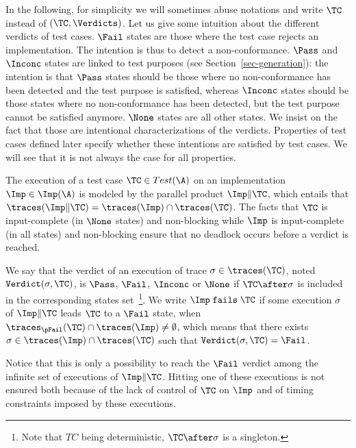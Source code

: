 \documentclass{LMCS}
\theoremstyle{plain}\newtheorem{proposition}[thm]{Proposition}
\begin{document}
\noindent In the following, for simplicity we will sometimes abuse notations and
write $\TC$ instead of $(\TC, \Verdicts)$.  Let us give some intuition about the different verdicts of test
cases. $\Fail$ states are those where the test case rejects an
implementation.  The intention is thus to detect a non-conformance.
$\Pass$ and $\Inconc$ states are linked to test purposes (see
Section~\ref{sec-generation}): the intention is that $\Pass$ states
should be those where no non-conformance has been detected and the
test purpose is satisfied, whereas $\Inconc$ states should be those
states where no non-conformance has been detected, but the test
purpose cannot be satisfied anymore.  $\None$ states are all other
states.  We insist on the fact that those are intentional
characterizations of the verdicts. Properties of test cases defined
later specify whether these intentions are satisfied by test cases.
We will see that it is not always the case for all properties.



The execution of a test case $\TC\in Test(\A)$ on an implementation $\Imp \in \Imp(\A)$
is  modeled by the parallel product $ \Imp \|\TC$,
which entails that $\traces(\Imp \| \TC) = 
\traces(\Imp) \cap \traces(\TC)$.
The facts that $\TC$ is input-complete (in $\None$ states) 
and non-blocking 
while  
$\Imp$ is input-complete (in all states) and non-blocking
ensure that no deadlock occurs before a verdict is reached.



We say that the verdict of an execution of trace $\sigma \in \traces(\TC)$,
noted ${\tt Verdict}(\sigma,\TC)$, is $\Pass$, $\Fail$, $\Inconc$ or $\None$
if $\TC \after \sigma$ is included in the corresponding states
set~\footnote{Note that $TC$ being deterministic, $\TC \after \sigma$ is a singleton.}.  
We write $\Imp \; {\tt fails} \; \TC$
if some execution $\sigma$ of $\Imp \| \TC$ leads $\TC$ to a $\Fail$
state, \ie when $\traces_{\pFail}(\TC) \cap \traces(\Imp) \neq
\emptyset$, which means that there exists $\sigma \in \traces(\Imp)
\cap \traces(\TC)$ such that 
${\tt Verdict}(\sigma,\TC)= \Fail$.
Notice that this is only a possibility to reach the
$\Fail$ verdict among the infinite set of executions of $\Imp  \| \TC$.  
Hitting one of these executions is not ensured both because 
of the lack of control of $\TC$ 
on $\Imp$ and of timing constraints imposed by these executions.
\end{document}
